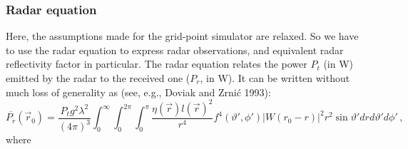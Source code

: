 \subsubsection{Radar equation}
Here, the assumptions made for the grid-point simulator are relaxed. So we have to use the radar equation to express radar observations, and equivalent radar reflectivity factor in particular.
The radar equation relates the power $P_t$ (in W) emitted by the radar to the received one ($P_r$, in W). It can be written without much loss of generality as (see, e.g., Doviak and Zrni\'c 1993): %
\begin{equation}
\overline{P_r}(\vec r_0)=\frac{P_tg^2\lambda^2}{(4\pi)^3}\int_0^\infty\!\!\!\int_0^{2\pi}\!\!\!\int_0^\pi\frac{\eta(\vec r) l(\vec r)^2}{r^4}f^4(\vartheta',\phi')|W(r_0-r)|^2r^2\sin\vartheta'd rd\vartheta'd\phi'\,,\label{eqrad}
\end{equation}
where
